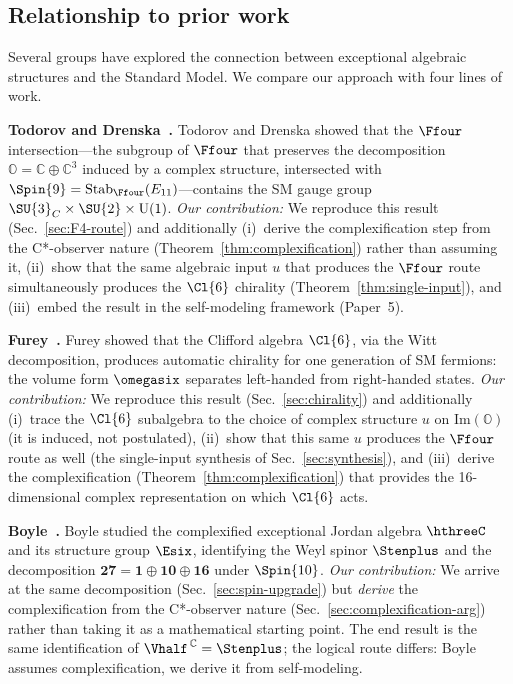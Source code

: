 \subsection{Relationship to prior work}\label{sec:prior-work}

Several groups have explored the connection between exceptional
algebraic structures and the Standard Model.  We compare our approach
with four lines of work.

\medskip
\noindent\textbf{Todorov and Drenska~\cite{TodorovDrenska2018,
Todorov2022}.}
Todorov and Drenska showed that the $\Ffour$ intersection---the
subgroup of $\Ffour$ that preserves the decomposition
$\mathbb{O} = \mathbb{C}\oplus\mathbb{C}^3$ induced by a complex
structure, intersected with $\Spin{9} = \mathrm{Stab}_{\Ffour}(E_{11})$---contains
the SM gauge group $\SU{3}_C\times\SU{2}\times\mathrm{U}(1)$.
\emph{Our contribution:} We reproduce this result (Sec.~\ref{sec:F4-route})
and additionally (i)~derive the complexification step from the
C*-observer nature (Theorem~\ref{thm:complexification}) rather than
assuming it, (ii)~show that the same
algebraic input $u$ that produces the $\Ffour$ route simultaneously
produces the $\Cl{6}$ chirality (Theorem~\ref{thm:single-input}), and
(iii)~embed the result in the self-modeling framework (Paper~5).

\medskip
\noindent\textbf{Furey~\cite{Furey2018}.}
Furey showed that the Clifford algebra $\Cl{6}$, via the Witt
decomposition, produces automatic chirality for one generation of SM
fermions: the volume form $\omegasix$ separates left-handed from
right-handed states.
\emph{Our contribution:} We reproduce this result
(Sec.~\ref{sec:chirality}) and additionally (i)~trace the $\Cl{6}$
subalgebra to the choice of complex structure $u$ on
$\mathrm{Im}(\mathbb{O})$ (it is induced, not postulated),
(ii)~show that this same $u$ produces the $\Ffour$ route as well
(the single-input synthesis of Sec.~\ref{sec:synthesis}), and
(iii)~derive the complexification
(Theorem~\ref{thm:complexification}) that provides the 16-dimensional
complex representation on which $\Cl{6}$ acts.

\medskip
\noindent\textbf{Boyle~\cite{Boyle2020}.}
Boyle studied the complexified exceptional Jordan algebra $\hthreeC$
and its structure group $\Esix$, identifying the Weyl spinor
$\Stenplus$ and the decomposition
$\mathbf{27} = \mathbf{1}\oplus\mathbf{10}\oplus\mathbf{16}$ under
$\Spin{10}$.
\emph{Our contribution:} We arrive at the same decomposition
(Sec.~\ref{sec:spin-upgrade}) but \emph{derive} the complexification
from the C*-observer nature (Sec.~\ref{sec:complexification-arg})
rather than taking it as a mathematical starting point.  The end
result is the same identification of $\Vhalf^{\,\mathbb{C}} = \Stenplus$;
the logical route differs: Boyle assumes complexification, we derive
it from self-modeling.

